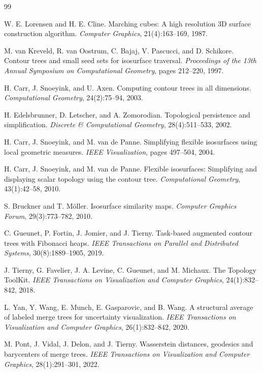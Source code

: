 \documentclass[twocolumn, a4paper, 10pt]{article}
\begin{document}
\clearpage
\begin{thebibliography}{99}

W. E. Lorensen and H. E. Cline.
Marching cubes: A high resolution 3D surface construction algorithm.
\textit{Computer Graphics}, 21(4):163--169, 1987.

M. van Kreveld, R. van Oostrum, C. Bajaj, V. Pascucci, and D. Schikore.
Contour trees and small seed sets for isosurface traversal.
\textit{Proceedings of the 13th Annual Symposium on Computational Geometry}, pages 212--220, 1997.

H. Carr, J. Snoeyink, and U. Axen.
Computing contour trees in all dimensions.
\textit{Computational Geometry}, 24(2):75--94, 2003.

H. Edelsbrunner, D. Letscher, and A. Zomorodian.
Topological persistence and simplification.
\textit{Discrete \& Computational Geometry}, 28(4):511--533, 2002.

H. Carr, J. Snoeyink, and M. van de Panne.
Simplifying flexible isosurfaces using local geometric measures.
\textit{IEEE Visualization}, pages 497--504, 2004.

H. Carr, J. Snoeyink, and M. van de Panne.
Flexible isosurfaces: Simplifying and displaying scalar topology using the contour tree.
\textit{Computational Geometry}, 43(1):42--58, 2010.

S. Bruckner and T. M\"oller.
Isosurface similarity maps.
\textit{Computer Graphics Forum}, 29(3):773--782, 2010.

C. Gueunet, P. Fortin, J. Jomier, and J. Tierny.
Task-based augmented contour trees with Fibonacci heaps.
\textit{IEEE Transactions on Parallel and Distributed Systems}, 30(8):1889--1905, 2019.

J. Tierny, G. Favelier, J. A. Levine, C. Gueunet, and M. Michaux.
The Topology ToolKit.
\textit{IEEE Transactions on Visualization and Computer Graphics}, 24(1):832--842, 2018.

L. Yan, Y. Wang, E. Munch, E. Gasparovic, and B. Wang.
A structural average of labeled merge trees for uncertainty visualization.
\textit{IEEE Transactions on Visualization and Computer Graphics}, 26(1):832--842, 2020.

M. Pont, J. Vidal, J. Delon, and J. Tierny.
Wasserstein distances, geodesics and barycenters of merge trees.
\textit{IEEE Transactions on Visualization and Computer Graphics}, 28(1):291--301, 2022.


\end{thebibliography}
\end{document}
